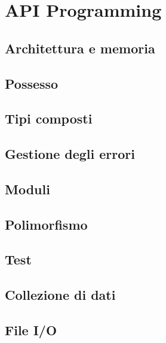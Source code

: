 \part{API Programming}
\label{part:APIProgramming}


\chapter[Architettura e memoria]{Architettura e memoria}



\chapter{Possesso}


\chapter{Tipi composti}


\chapter{Gestione degli errori}


\chapter{Moduli}


\chapter{Polimorfismo}


\chapter{Test}


\chapter{Collezione di dati}


\chapter{File I/O}


